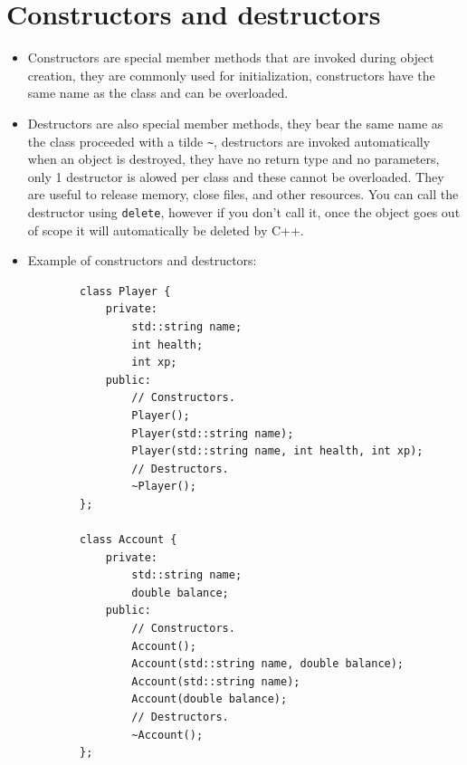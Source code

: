 \section{Constructors and destructors}
\begin{itemize}
    \item Constructors are special member methods that are invoked during object creation, they are commonly used for initialization, constructors have the same name as the class and can be overloaded. 
    
    \item Destructors are also special member methods, they bear the same name as the class proceeded with a tilde \verb|~|, destructors are invoked automatically when an object is destroyed, they have no return type and no parameters, only 1 destructor is alowed per class and these cannot be overloaded. They are useful to release memory, close files, and other resources. You can call the destructor using \texttt{delete}, however if you don't call it, once the object goes out of scope it will automatically be deleted by C++.
    \item Example of constructors and destructors:
    \begin{verbatim}
        class Player {
            private:
                std::string name;
                int health;
                int xp;
            public:
                // Constructors.
                Player();
                Player(std::string name);
                Player(std::string name, int health, int xp);
                // Destructors.
                ~Player();
        };

        class Account {
            private:
                std::string name;
                double balance;
            public: 
                // Constructors.
                Account();
                Account(std::string name, double balance);
                Account(std::string name);
                Account(double balance);
                // Destructors.
                ~Account();
        };
    \end{verbatim}
\end{itemize}

